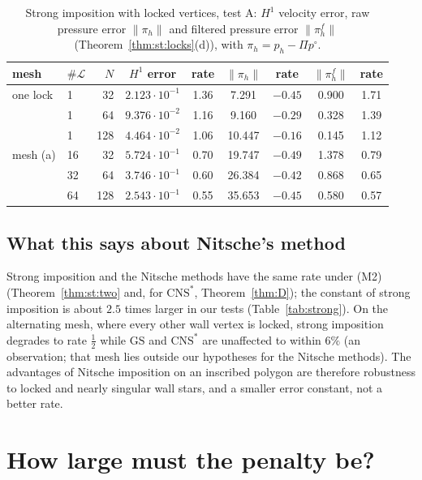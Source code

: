 \documentclass[pdflatex,sn-mathphys-num]{sn-jnl}
\theoremstyle{thmstyleone}
\theoremstyle{thmstylethree}
\newcommand{\norm}[1]{\lVert #1\rVert}
\newcommand{\GS}{\mathrm{GS}}
\newcommand{\CNS}{\mathrm{CNS}^\ast}
\newcommand{\Lk}{\mathcal L}
\begin{document}
\begin{table}[t]
\centering\small
\caption{Strong imposition with locked vertices, test A: $H^1$ velocity error, raw pressure error $\norm{\pi_h}$ and filtered pressure error $\norm{\pi_h^f}$ (Theorem~\ref{thm:st:locks}(d)), with $\pi_h=p_h-\Pi p^\circ$.}\label{tab:locks}
\begin{tabular}{llrcccccc}
\toprule
mesh & $\#\Lk$ & $N$ & $H^1$ error & rate & $\norm{\pi_h}$ & rate & $\norm{\pi_h^f}$ & rate\\
\midrule
one lock & 1 & 32 & $2.123\cdot10^{-1}$ & 1.36 & 7.291 & $-0.45$ & 0.900 & 1.71\\
 & 1 & 64 & $9.376\cdot10^{-2}$ & 1.16 & 9.160 & $-0.29$ & 0.328 & 1.39\\
 & 1 & 128 & $4.464\cdot10^{-2}$ & 1.06 & 10.447 & $-0.16$ & 0.145 & 1.12\\
mesh (a) & 16 & 32 & $5.724\cdot10^{-1}$ & 0.70 & 19.747 & $-0.49$ & 1.378 & 0.79\\
 & 32 & 64 & $3.746\cdot10^{-1}$ & 0.60 & 26.384 & $-0.42$ & 0.868 & 0.65\\
 & 64 & 128 & $2.543\cdot10^{-1}$ & 0.55 & 35.653 & $-0.45$ & 0.580 & 0.57\\
\bottomrule
\end{tabular}
\end{table}

\subsection{What this says about Nitsche's method}
Strong imposition and the Nitsche methods have the same rate under (M2) (Theorem~\ref{thm:st:two} and, for $\CNS$, Theorem~\ref{thm:D}); the constant of strong imposition is about $2.5$ times larger in our tests (Table~\ref{tab:strong}). On the alternating mesh, where every other wall vertex is locked, strong imposition degrades to rate $\frac12$ while $\GS$ and $\CNS$ are unaffected to within $6\%$ (an observation; that mesh lies outside our hypotheses for the Nitsche methods). The advantages of Nitsche imposition on an inscribed polygon are therefore robustness to locked and nearly singular wall stars, and a smaller error constant, not a better rate.

\section{How large must the penalty be?}\label{sec:penalty}
\end{document}
